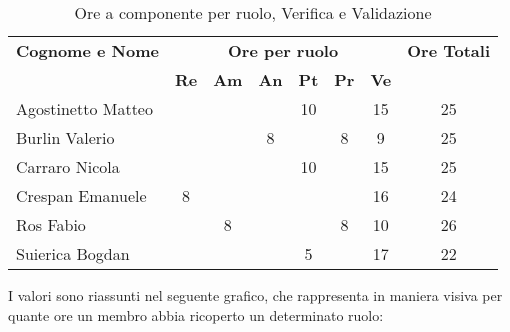 \begin{table}[h]
\centering
\begin{tabular}{|l|c|c|c|c|c|c|c|}
	\toprule
	\textbf{Cognome e Nome} & \multicolumn{6}{c}{\textbf{Ore per ruolo}} & \textbf{Ore Totali} \\
	& \textbf{Re} & \textbf{Am} & \textbf{An} & \textbf{Pt} & \textbf{Pr} & \textbf{Ve} & \\
		
	\midrule
	Agostinetto Matteo & & & & 10 & & 15 & 25 \\
	Burlin Valerio & & & 8 & & 8 & 9 & 25 \\ 
	Carraro Nicola & & & & 10 & & 15 & 25 \\
	Crespan Emanuele & 8 & & & & & 16 & 24 \\
	Ros Fabio & & 8 & & & 8 & 10 & 26 \\
	Suierica Bogdan & & & & 5 & & 17 & 22 \\
		
	\bottomrule
\end{tabular}
\caption{Ore a componente per ruolo, Verifica e Validazione}
\end{table}

\noindent I valori sono riassunti nel seguente grafico, che rappresenta in maniera visiva per quante ore un membro abbia ricoperto un determinato ruolo:

